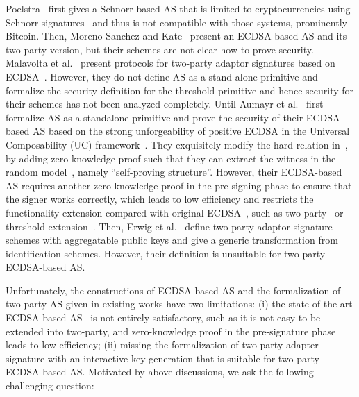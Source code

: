 \documentclass{llncs}
\begin{document}
Poelstra~\cite{Poelstra2017} first gives a Schnorr-based AS that is limited to cryptocurrencies using Schnorr signatures~\cite{Sch89} and thus is not compatible with those systems, prominently Bitcoin. Then, Moreno-Sanchez and Kate~\cite{Moreno-Sanchez2018} present an ECDSA-based AS and its two-party version, but their schemes are not clear how to prove security. Malavolta et al.~\cite{MalavoltaMSKM19} present protocols for two-party adaptor signatures based on ECDSA~\cite{ECDSA}. However, they do not define AS as a stand-alone primitive and formalize the security definition for the threshold primitive and hence security for their schemes has not been analyzed completely. Until Aumayr et al.~\cite{AumayrEEFHMMR20} first formalize AS as a standalone primitive and prove the security of their ECDSA-based AS based on the strong unforgeability of positive ECDSA in the Universal Composability (UC) framework~\cite{Canetti01}. They exquisitely modify the hard relation in~\cite{Moreno-Sanchez2018}, by adding zero-knowledge proof such that they can extract the witness in the random model~\cite{Fischlin05}, namely ``self-proving structure''. However, their ECDSA-based AS requires another zero-knowledge proof in the pre-signing phase to ensure that the signer works correctly, which leads to low efficiency and restricts the functionality extension compared with original ECDSA~\cite{ECDSA}, such as two-party~\cite{Lin17,CCLST19,YuenCX21} or threshold extension~\cite{GGN16,BGG17,LN18,GG18,DKLs19}. Then, Erwig et al.~\cite{ErwigFHM021} define two-party adaptor signature schemes with aggregatable public keys and give a generic transformation from identification schemes. However, their definition is unsuitable for two-party ECDSA-based AS.  


Unfortunately, the constructions of ECDSA-based AS and the formalization of two-party AS given in existing works have two limitations: (i) the state-of-the-art ECDSA-based AS~\cite{AumayrEEFHMMR20} is not entirely satisfactory, such as it is not easy to be extended into two-party, and zero-knowledge proof in the pre-signature phase leads to low efficiency; (ii) missing the formalization of two-party adapter signature with an interactive key generation that is suitable for two-party ECDSA-based AS. Motivated by above discussions, we ask the following challenging question:\\
\end{document}
